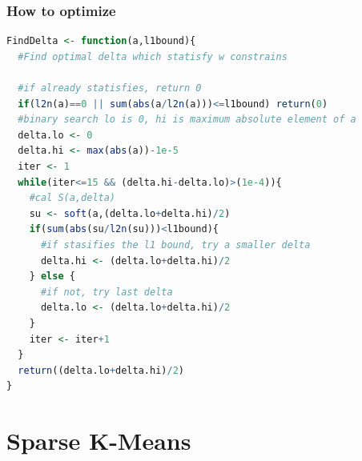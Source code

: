 \documentclass{beamer}
\begin{document}
\begin{frame}[fragile]
\frametitle{How to optimize}

\begin{lstlisting}[language=R]
FindDelta <- function(a,l1bound){
  #Find optimal delta which statisfy w constrains

  #if already statisfies, return 0
  if(l2n(a)==0 || sum(abs(a/l2n(a)))<=l1bound) return(0)
  #binary search lo is 0, hi is maximum absolute element of a
  delta.lo <- 0
  delta.hi <- max(abs(a))-1e-5
  iter <- 1
  while(iter<=15 && (delta.hi-delta.lo)>(1e-4)){
    #cal S(a,delta)
    su <- soft(a,(delta.lo+delta.hi)/2)
    if(sum(abs(su/l2n(su)))<l1bound){
      #if stasifies the l1 bound, try a smaller delta
      delta.hi <- (delta.lo+delta.hi)/2
    } else {
      #if not, try last delta
      delta.lo <- (delta.lo+delta.hi)/2
    }
    iter <- iter+1
  }
  return((delta.lo+delta.hi)/2)
}
\end{lstlisting}

\end{frame}
\section{Sparse K-Means}
\end{document}
